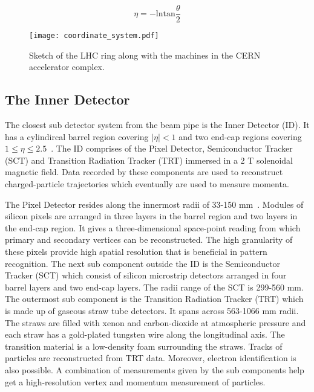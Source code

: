 \begin{equation*}
    \eta = -\text{ln} \text{tan}\frac{\theta}{2}
\end{equation*}

\begin{figure}[htbp]
    \centering
    \texttt{[image: coordinate\_system.pdf]}
    \caption[Sketch of the CERN accelerator complex]{Sketch of the LHC ring along with the machines in the CERN accelerator complex\cite{Haffner:1621894}.}%
    \label{fig:coordinatesys}
\end{figure}

\subsection{The Inner Detector}
The closest sub detector system from the beam pipe is the Inner Detector (ID). It has a cylindircal barrel region covering $|\eta|<1$ and two end-cap regions covering 
$1 \leq \eta \leq 2.5$~\cite{BARBERIS2000331}. The ID comprises of the Pixel Detector, Semiconductor Tracker (SCT) and Transition Radiation Tracker (TRT) immersed in a 2 T solenoidal 
magnetic field. Data recorded by these components are used to reconstruct charged-particle trajectories which eventually are used to measure momenta. 

The Pixel Detector resides along the innermost radii of 33-150 mm~\cite{Aaboud_2017}. Modules of silicon pixels are arranged in three layers in the barrel region and two layers in the end-cap region. 
It gives a three-dimensional space-point reading from which primary and secondary vertices can be reconstructed. The high granularity of these pixels provide high spatial 
resolution that is beneficial in pattern recognition. The next sub component outside the ID is the Semiconductor Tracker (SCT) which consist of silicon microstrip detectors 
arranged in four barrel layers and two end-cap layers. The radii range of the SCT is 299-560 mm. The outermost sub component is the Transition Radiation Tracker (TRT) which 
is made up of gaseous straw tube detectors. It spans across 563-1066 mm radii. The straws are filled with xenon and carbon-dioxide at atmospheric pressure and each straw
has a gold-plated tungsten wire along the longitudinal axis. The transition material is a low-density foam surrounding the straws. Tracks of particles are reconstructed from TRT
data. Moreover, electron identification is also possible. A combination of measurements given by the sub components help get a high-resolution vertex and momentum measurement of
particles. 

